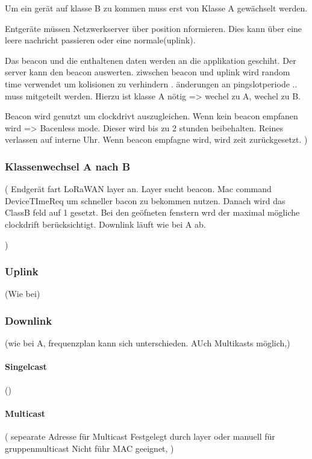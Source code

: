 \documentclass[a4paper,12pt]{article}
\begin{document}
                Um ein gerät auf klasse B zu kommen muss erst von Klasse A gewächselt werden.

                Entgeräte müssen Netzwerkserver über position nformieren. Dies kann über eine leere nachricht passieren oder eine normale(uplink).
                
                Das beacon und die enthaltenen daten werden an die applikation geschiht. Der server kann den beacon auswerten. ziwschen beacon und uplink wird random time verwendet um kolisionen zu verhindern .
                änderungen an pingslotperiode .. muss mitgeteilt werden. Hierzu ist klasse A nötig => wechel zu A, wechel zu B.
            
                Beacon wird genutzt um clockdrivt auszugleichen. Wenn kein beacon empfanen wird  => Bacenless mode. Dieser wird bis zu 2 stunden beibehalten. Reines verlassen auf interne Uhr. Wenn beacon empfagne wird, wird zeit zurückgesetzt.
            )
            \subsubsection{Klassenwechsel A nach B}
                \cite{LoRaSpec}(
                    Endgerät fart LoRaWAN layer an. Layer sucht beacon. Mac command DeviceTImeReq um schneller bacon zu bekommen nutzen. Danach wird das ClassB feld auf 1 gesetzt. Bei den geöfneten fenstern wrd der maximal mögliche clockdrift berücksichtigt.
                    Downlink läuft wie bei A ab.


                )
            \subsubsection{Uplink}
                \cite{LoRaSpec}(Wie bei)
            \subsubsection{Downlink}
                \cite{LoRaSpec}(wie bei A, frequenzplan kann sich unterschieden. AUch Multikasts möglich,)
                \paragraph{Singelcast}
                    \cite{LoRaSpec}()
                \paragraph{Multicast}
                    \cite{LoRaSpec}(
                        sepearate Adresse für Multicast
                        Festgelegt durch layer oder manuell für gruppenmulticast
                        Nicht führ MAC geeignet, 
                    )
\end{document}

